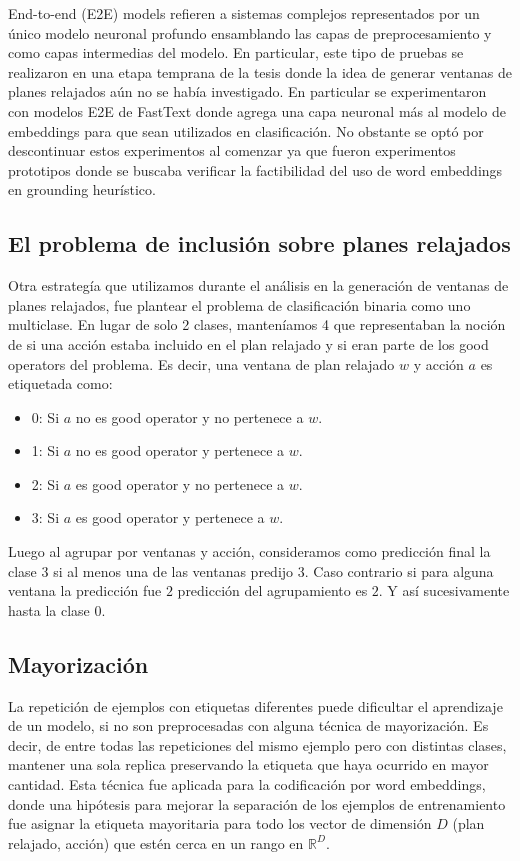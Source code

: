 End-to-end (E2E) models refieren a sistemas complejos representados por un único
modelo neuronal profundo ensamblando las capas de preprocesamiento y como capas
intermedias del modelo. En particular, este tipo de pruebas se realizaron en una
etapa temprana de la tesis donde la idea de generar ventanas de planes relajados
aún no se había investigado. En particular se experimentaron con modelos E2E de
FastText donde agrega una capa neuronal más al modelo de embeddings para que
sean utilizados en clasificación. No obstante se optó por descontinuar estos
experimentos al comenzar ya que fueron experimentos prototipos donde se buscaba
verificar la factibilidad del uso de word embeddings en grounding heurístico.

\subsection{El problema de inclusión sobre planes relajados}

Otra estrategía que utilizamos durante el análisis en la generación de ventanas
de planes relajados, fue plantear el problema de clasificación binaria como uno
multiclase. En lugar de solo 2 clases, manteníamos 4 que representaban la noción
de si una acción estaba incluido en el plan relajado y si eran parte de los good
operators del problema. Es decir, una ventana de plan relajado $w$ y acción $a$
es etiquetada como:

\begin{itemize}
    \item 0: Si $a$ no es good operator y no pertenece a $w$.
    \item 1: Si $a$ no es good operator y pertenece a $w$.
    \item 2: Si $a$ es good operator y no pertenece a $w$.
    \item 3: Si $a$ es good operator y pertenece a $w$.
\end{itemize}

Luego al agrupar por ventanas y acción, consideramos como predicción final la
clase $3$ si al menos una de las ventanas predijo $3$. Caso contrario si para
alguna ventana la predicción fue $2$ predicción del agrupamiento es $2$. Y así
sucesivamente hasta la clase $0$.

\subsection{Mayorización}

La repetición de ejemplos con etiquetas diferentes puede dificultar el
aprendizaje de un modelo, si no son preprocesadas con alguna técnica de
mayorización. Es decir, de entre todas las repeticiones del mismo ejemplo pero
con distintas clases, mantener una sola replica preservando la etiqueta que haya
ocurrido en mayor cantidad. Esta técnica fue aplicada para la codificación por
word embeddings, donde una hipótesis para mejorar la separación de los ejemplos
de entrenamiento fue asignar la etiqueta mayoritaria para todo los vector de
dimensión $D$ (plan relajado, acción) que estén cerca en un rango en
$\mathbb{R}^{D}$.

